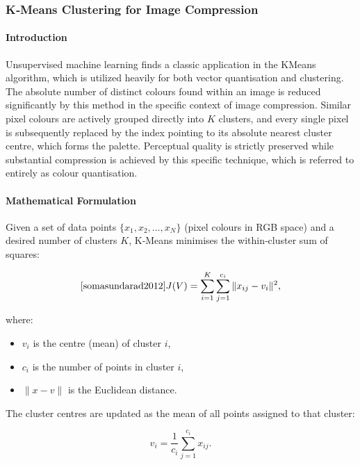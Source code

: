 \subsubsection{K‑Means Clustering for Image Compression}




\paragraph{Introduction}
Unsupervised machine learning finds a classic application in the KMeans algorithm, which is utilized heavily for both vector quantisation and clustering. The absolute number of distinct colours found within an image is reduced significantly by this method in the specific context of image compression. Similar pixel colours are actively grouped directly into $K$ clusters, and every single pixel is subsequently replaced by the index pointing to its absolute nearest cluster centre, which forms the palette. Perceptual quality is strictly preserved while substantial compression is achieved by this specific technique, which is referred to entirely as colour quantisation.









\paragraph{Mathematical Formulation}
Given a set of data points $\{x_1, x_2, \dots, x_N\}$ (pixel colours in RGB space) and a desired number of clusters $K$, K‑Means minimises the within‑cluster sum of squares:

\[ \cite{somasundarad2012}
J(V) = \sum_{i=1}^{K} \sum_{j=1}^{c_i} \| x_{ij} - v_i \|^2,
\]

where:
\begin{itemize}
    \item $v_i$ is the centre (mean) of cluster $i$,
    \item $c_i$ is the number of points in cluster $i$, \cite{somasundarad2012}
    \item $\|x - v\|$ is the Euclidean distance.
\end{itemize}

The cluster centres are updated as the mean of all points assigned to that cluster\cite{somasundarad2012, Khaleel2014}:

\[
v_i = \frac{1}{c_i} \sum_{j=1}^{c_i} x_{ij}.
\] 

